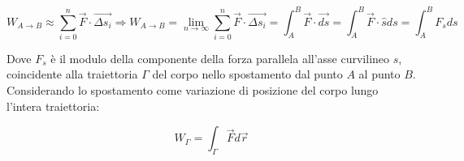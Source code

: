 \documentclass{article}
\numberwithin{equation}{subsection}
\begin{document}
\begin{equation}
    \displaystyle W_{A\to B}\approx\sum_{i=0}^{n}\vec{F}\cdot\vec{\Delta s_i}\Rightarrow W_{A\to B}=\lim_{n\to\infty}\sum_{i=0}^{n}\vec{F}\cdot\vec{\Delta s_i}=\int_{A}^{B}\vec{F}\cdot\vec{ds}=\int_{A}^{B}\vec{F}\cdot\hat{s}ds=\int_{A}^{B}F_sds
\end{equation}   

Dove $F_s$ è il modulo della componente della forza parallela 
all'asse curvilineo $s$, coincidente alla traiettoria $\Gamma$ 
del corpo nello spostamento dal punto $A$ al punto $B$.
Considerando lo spostamento come variazione di posizione 
del corpo lungo l'intera traiettoria:

\begin{equation}
    \displaystyle W_{\Gamma}=\int_{\Gamma}\vec{F}d\vec{r}
\end{equation}

\begin{center}\end{center}
\end{document}
